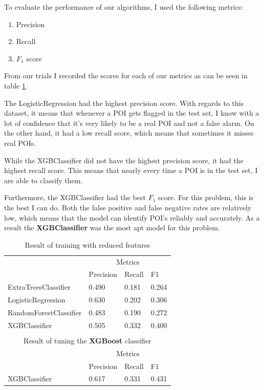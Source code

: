 \documentclass[titlepage,numbers=noenddot,headinclude,%
               footinclude=true,abstractoff,BCOR=5mm,%
               paper=a4,fontsize=11pt,ngerman,american]{scrreprt}
\numberwithin{theorem}{chapter}
\numberwithin{definition}{chapter}
\numberwithin{algorithm}{chapter}
\numberwithin{figure}{chapter}
\numberwithin{table}{chapter}
\numberwithin{equation}{chapter}
\begin{document}
To evaluate the performance of our algorithms, I used the following metrics:
\begin{enumerate}
\item Precision
\item Recall
\item $F_1$ score
\end{enumerate}

From our trials I recorded the scores for each of our metrics as can be seen in table \ref{tableReducedFeatures}.

The LogisticRegression had the highest precision score. With regards to this dataset, it means that whenever a POI gets flagged in the test set, I know with a lot of confidence that it's very likely to be a real POI and not a false alarm. On the other hand, it had a low recall score, which means that sometimes it misses real POIs.

While the XGBClassifier did not have the highest precision score, it had the highest recall score. This means that nearly every time a POI is in the test set, I are able to classify them.

Furthermore, the XGBClassifier had the best $F_1$ score. For this problem, this is the best I can do. Both the false positive and false negative rates are relatively low, which means that the model can identify POI's reliably and accurately. As a result the \textbf{XGBClassifier} was the most apt model for this problem.



\setlength{\extrarowheight}{1.5pt}
\begin{table}[!htbp]
\caption{Result of training with reduced features} %
\centering %
\begin{tabular}{|p{6cm}|p{1.5cm}|p{1.5cm}|p{1.5cm}|} %
\hline %
& \multicolumn{3}{c|}{Metrics}\\[5pt]
\cline{2-4}
& Precision & Recall & F1\\[0.5ex]
\hline %

ExtraTreesClassifier     &  0.490       &  0.181     &  0.264     \\
LogisticRegression       &  0.630       &  0.202     &  0.306     \\
RandomForestClassifier   &  0.483       &  0.190     &  0.272     \\
XGBClassifier            &  0.505       &  0.332     &  0.400     \\
\hline%

\multicolumn{4}{|c|}{}\\
\multicolumn{4}{|c|}{Result of tuning the \textbf{XGBoost} classifier}\\[5pt]
\hline
& \multicolumn{3}{c|}{Metrics}\\[5pt]
\cline{2-4}
& Precision & Recall & F1\\[0.5ex]
\hline %

XGBClassifier           &  0.617  & 0.331  & 0.431\\
\hline
\end{tabular}
\label{tableReducedFeatures}
\end{table}
\end{document}
